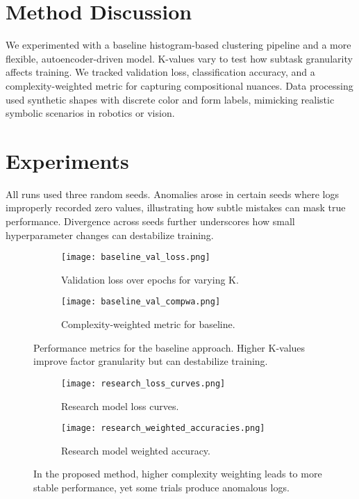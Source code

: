 \documentclass{article}
\begin{document}
\section{Method Discussion}
We experimented with a baseline histogram-based clustering pipeline and a more flexible, autoencoder-driven model. K-values vary to test how subtask granularity affects training. We tracked validation loss, classification accuracy, and a complexity-weighted metric for capturing compositional nuances. Data processing used synthetic shapes with discrete color and form labels, mimicking realistic symbolic scenarios in robotics or vision.

\section{Experiments}
All runs used three random seeds. Anomalies arose in certain seeds where logs improperly recorded zero values, illustrating how subtle mistakes can mask true performance. Divergence across seeds further underscores how small hyperparameter changes can destabilize training.

\begin{figure}[t]
    \centering
    \begin{subfigure}{0.48\linewidth}
        \texttt{[image: baseline\_val\_loss.png]}
        \caption{Validation loss over epochs for varying K.}
    \end{subfigure}
    \hfill
    \begin{subfigure}{0.48\linewidth}
        \texttt{[image: baseline\_val\_compwa.png]}
        \caption{Complexity-weighted metric for baseline.}
    \end{subfigure}
    \vspace{-1em}
    \caption{Performance metrics for the baseline approach. Higher K-values improve factor granularity but can destabilize training.}
    \label{fig:baseline}
\end{figure}

\begin{figure}[t]
    \centering
    \begin{subfigure}{0.48\linewidth}
        \texttt{[image: research\_loss\_curves.png]}
        \caption{Research model loss curves.}
    \end{subfigure}
    \hfill
    \begin{subfigure}{0.48\linewidth}
        \texttt{[image: research\_weighted\_accuracies.png]}
        \caption{Research model weighted accuracy.}
    \end{subfigure}
    \vspace{-1em}
    \caption{In the proposed method, higher complexity weighting leads to more stable performance, yet some trials produce anomalous logs.}
    \label{fig:research}
\end{figure}
\end{document}
